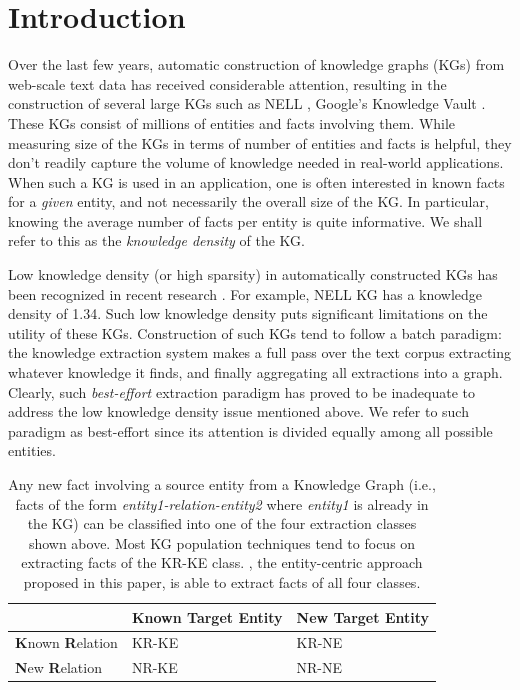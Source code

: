 \section{Introduction}
\label{sec:intro}



Over the last few years, automatic construction of knowledge graphs (KGs) from web-scale text data has received considerable attention, resulting in the construction of several large KGs such as NELL \cite{mitchell2015never}, Google's Knowledge Vault \cite{dong2014knowledge}. These KGs consist of millions of entities and facts involving them. While measuring size of the KGs in terms of number of entities and facts is helpful, they don't readily capture the volume of knowledge needed in real-world applications. When such a KG is used in an application, one is often interested in known facts for a \emph{given} entity, and not necessarily the overall size of the KG. In particular, knowing the average number of facts per entity is quite informative. We shall refer to this as the \textit{knowledge density} of the KG. %

Low knowledge density (or high sparsity) in automatically constructed KGs has been recognized in recent research \cite{west2014knowledge}. For example, NELL KG has a knowledge density of 1.34. Such low knowledge density puts significant limitations on the utility of these KGs. Construction of such KGs tend to follow a batch paradigm: the knowledge extraction system makes a full pass over the text corpus extracting whatever knowledge it finds, and finally aggregating all extractions into a graph. Clearly, such \emph{best-effort} extraction paradigm has proved to be inadequate to address the low knowledge density issue mentioned above. We refer to such paradigm as best-effort since its attention is divided equally among all possible entities.

\begin{table}[t]
	\begin{center}
		{\small
		\begin{tabular}{|p{1.5cm}|C{2.2cm}|C{1.8cm}|}
		\hline
		& {\bf K}nown Target {\bf E}ntity & {\bf N}ew Target {\bf E}ntity \\
		\hline
		{\bf K}nown {\bf R}elation & KR-KE & KR-NE \\
		\hline
		{\bf N}ew {\bf R}elation & NR-KE & NR-NE \\
		\hline
		\end{tabular}
		}		
\caption{\label{tbl:extraction_taxonomy}Any  new fact involving a source entity from a Knowledge Graph (i.e., facts of the form \textit{entity1-relation-entity2} where  \textit{entity1} is already in the KG) can be classified into one of the  four extraction classes shown above. Most KG population techniques tend to focus on extracting facts of the KR-KE class. \system{}, the entity-centric approach proposed in this paper, is able to extract facts of all four classes.}
	\end{center}
\end{table}

